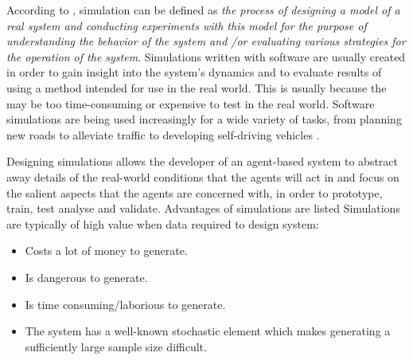 According to \citeauthor{Shannon1998INTRODUCTIONSIMULATION}, simulation can be defined as \textit{ the process of designing
a model of a real system and conducting experiments with
this model for the purpose of understanding the behavior of
the system and /or evaluating various strategies for the
operation of the system}. Simulations written with software are usually created in order to gain insight into the system's dynamics and to evaluate results of using a method intended for use in the real world. This is usually because the may be too time-consuming or expensive to test in the real world. Software simulations are being used increasingly for a wide variety of tasks, from planning new roads to alleviate traffic \cite{Pell2017TrendsSimulation} to developing self-driving vehicles \cite{Dosovitskiy2017CARLA:Simulator}. 

Designing simulations allows the developer of an agent-based system to abstract away details of the real-world conditions that the agents will act in and focus on the salient aspects that the agents are concerned with, in order to prototype, train, test analyse and validate. Advantages of simulations are listed \cite{Shannon1998INTRODUCTIONSIMULATION} Simulations are typically of high value when data required to design system:
\begin{itemize}
    \item Costs a lot of money to generate.
    \item Is dangerous to generate.
    \item Is time consuming/laborious to generate.
    \item The system has a well-known stochastic element which makes generating a sufficiently large sample size difficult.
\end{itemize}




